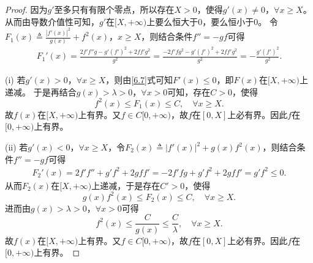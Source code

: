 \documentclass[../../main.tex]{subfiles}%
\begin{document}
\begin{proof}

因为\(g'\)至多只有有限个零点，所以存在\(X>0\)，使得\(g'( x ) \ne 0\)，\(\forall x\geqslant X\)。从而由导数介值性可知，\(g'\)在\([ X,+\infty )\)上要么恒大于\(0\)，要么恒小于\(0\)。
令\(F_1( x ) \triangleq \frac{| f'( x ) |^2}{g( x )}+f^2( x )\)，\(x\geqslant X\)，则结合条件\(f'' =-gf\)可得
\begin{align}
F_{1}'( x ) =\frac{2f'f'' g-g'( f' )^2+2ff' g^2}{g^2}=\frac{-2f'fg^2-g'( f' )^2+2ff'g^2}{g^2}=-\frac{g'( f' )^2}{g^2}. \label{6.7}
\end{align}

(i) 若\(g'( x ) >0\)，\(\forall x\geqslant X\)，则由\eqref{6.7}式可知\(F'( x ) \leqslant 0\)，即\(F( x )\)在\([ X,+\infty )\)上递减。
于是再结合\(g( x ) >\lambda >0\)，\(\forall x>0\)可知，存在\(C>0\)，使得
\[
f^2( x ) \leqslant F_1( x ) \leqslant C,\quad\forall x\geqslant X.
\]
故\(f( x )\)在\([ X,+\infty )\)上有界。又\(f\in C[ 0,+\infty )\)，故\(f\)在\([ 0,X ]\)上必有界。因此\(f\)在\([ 0,+\infty )\)上有界。

(ii) 若\(g'( x ) <0\)，\(\forall x\geqslant X\)，令\(F_2( x ) \triangleq | f'( x ) |^2+g( x ) f^2( x )\)，则结合条件\(f'' =-gf\)可得
\begin{align}
F_{2}'( x ) =2f'f'' +g'f^2+2gff' =-2f'fg+g'f^2+2gff' =g'f^2\leqslant 0. \label{6.8}
\end{align}
从而\(F_2( x )\)在\([ X,+\infty )\)上递减，于是存在\(C'>0\)，使得
\[
g( x ) f^2( x ) \leqslant F_2( x ) \leqslant C,\quad\forall x\geqslant X.
\]
进而由\(g( x ) >\lambda >0\)，\(\forall x>0\)可得
\[
f^2( x ) \leqslant \frac{C}{g( x )}\leqslant \frac{C}{\lambda},\quad\forall x\geqslant X.
\]
故\(f( x )\)在\([ X,+\infty )\)上有界。又\(f\in C[ 0,+\infty )\)，故\(f\)在\([ 0,X ]\)上必有界。因此\(f\)在\([ 0,+\infty )\)上有界。

\end{proof}
\end{document}

